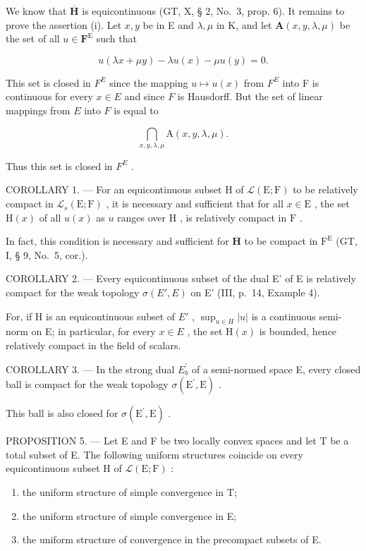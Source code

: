 We know that \(\overline{\mathbf{H}}\) is equicontinuous (GT, X, § 2, No.~3, prop. 6). It remains to prove the assertion (i). Let \(x, y\) be in E and \(\lambda, \mu\) in K, and let \(\mathbf{A}(x, y, \lambda, \mu)\) be the set of all \(u \in \mathbf{F}^{\mathrm{E}}\) such that

\[
u (\lambda x + \mu y) - \lambda u (x) - \mu u (y) = 0.
\]

This set is closed in \(F^{E}\) since the mapping \(u \mapsto u(x)\) from \(F^{E}\) into F is continuous for every \(x \in E\) and since \(F\) is Hausdorff. But the set of linear mappings from \(E\) into \(F\) is equal to

\[
\bigcap_ {x, y, \lambda , \mu} \mathrm{A} (x, y, \lambda , \mu).
\]

Thus this set is closed in \(F^{E}\) .

COROLLARY 1. --- For an equicontinuous subset H of \(\mathcal{L}(\mathrm{E};\mathrm{F})\) to be relatively compact in \(\mathcal{L}_s(\mathrm{E};\mathrm{F})\) , it is necessary and sufficient that for all \(x\in \mathrm{E}\) , the set \(\mathrm{H}(x)\) of all \(u(x)\) as \(u\) ranges over \(\mathrm{H}\) , is relatively compact in \(\mathrm{F}\) .

In fact, this condition is necessary and sufficient for \(\overline{\mathbf{H}}\) to be compact in \(\mathrm{F}^{\mathrm{E}}\) (GT, I, § 9, No.~5, cor.).

COROLLARY 2. --- Every equicontinuous subset of the dual E' of E is relatively compact for the weak topology \(\sigma(E', E)\) on E' (III, p.~14, Example 4).

For, if H is an equicontinuous subset of \(E'\) , \(\sup_{u\in H}|u|\) is a continuous semi-norm on E; in particular, for every \(x\in E\) , the set \(\mathrm{H}(x)\) is bounded, hence relatively compact in the field of scalars.

COROLLARY 3. --- In the strong dual \(E_{b}^{\prime}\) of a semi-normed space E, every closed ball is compact for the weak topology \(\sigma(\mathrm{E}^{\prime},\mathrm{E})\) .

This ball is also closed for \(\sigma(\mathrm{E}^{\prime},\mathrm{E})\) .

PROPOSITION 5. --- Let E and F be two locally convex spaces and let T be a total subset of E. The following uniform structures coincide on every equicontinuous subset H of \(\mathcal{L}(\mathrm{E};\mathrm{F})\) :

\begin{enumerate}
\def\labelenumi{\arabic{enumi})}
\item
  the uniform structure of simple convergence in T;
\item
  the uniform structure of simple convergence in E;
\item
  the uniform structure of convergence in the precompact subsets of E.
\end{enumerate}

